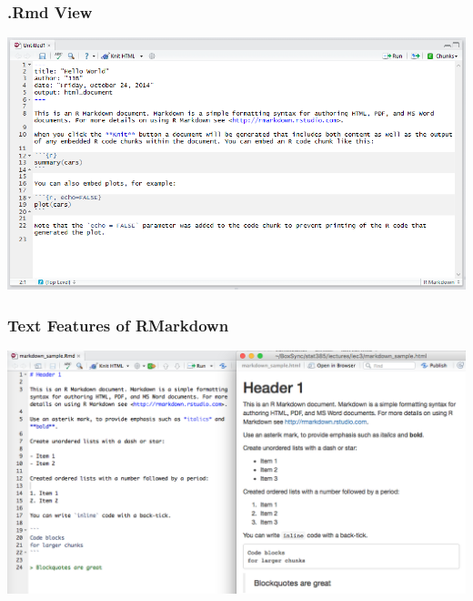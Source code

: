 \documentclass{beamer}\usepackage[]{graphicx}\usepackage[]{color}
\begin{document}
\begin{frame}
\frametitle{.Rmd View}
\begin{center}
\includegraphics[scale=0.40]{img/rmd/default_rmd.png}
\end{center}
\end{frame}

\begin{frame}
\frametitle{Text Features of RMarkdown}
\begin{center}
\includegraphics[scale=.3]{img/rmd/rmarkdown_overview.png}
\end{center}
\end{frame}
\end{document}
